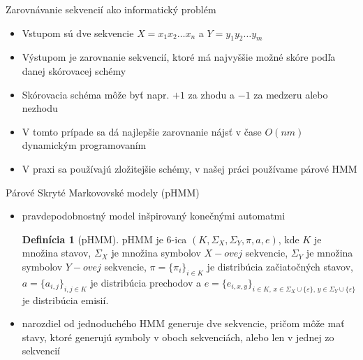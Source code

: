 \documentclass[xcolor=dvipsnames, compress, 12pt]{beamer}
\theoremstyle{definition}
\newtheorem{df}[vt]{Definícia}
\begin{document}
\begin{frame}[fragile]{Zarovnávanie sekvencií ako informatický problém}
\begin{itemize}
  \item Vstupom sú dve sekvencie $X = x_1x_2\dots x_n$ a $Y = y_1y_2\dots y_m$
  \item Výstupom je zarovnanie sekvencií, ktoré má najvyššie možné skóre podľa danej skórovacej schémy
  \item Skórovacia schéma môže byť napr. $+1$ za zhodu a $-1$ za medzeru alebo nezhodu
  \item V tomto prípade sa dá najlepšie zarovnanie nájsť v čase $O(nm)$ dynamickým programovaním
  \item V praxi sa používajú zložitejšie schémy, v našej práci používame párové HMM
\end{itemize}
\end{frame}

\begin{frame}{Párové Skryté Markovovské modely (pHMM)}
   \begin{itemize}
    \item pravdepodobnostný model inšpirovaný konečnými automatmi

    \begin{df}[pHMM]
        pHMM je 6-ica $(K, \Sigma_X, \Sigma_Y, \pi, a, e)$, kde $K$ je množina stavov, $\Sigma_X$ je množina symbolov $X-ovej$ sekvencie, $\Sigma_Y$ je množina symbolov $Y-ovej$ sekvencie, $\pi = \{\pi_i\}_{i \in K}$ je distribúcia začiatočných stavov, $a = \{a_{i,j}\}_{i, j \in K}$ je distribúcia prechodov a $e = \{e_{i,x,y}\}_{i\in K,\, x\in \Sigma_X \cup \{\varepsilon\},\, y\in \Sigma_Y \cup \{\varepsilon\}}$ je distribúcia emisií.
    \end{df}

    \item narozdiel od jednoduchého HMM generuje dve sekvencie, pričom môže mať stavy, ktoré generujú symboly v oboch sekvenciách, alebo len v jednej zo sekvencií
  \end{itemize}

\end{frame}
\end{document}
